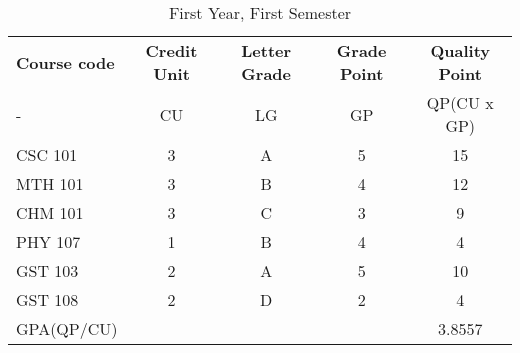 \documentclass{article}
\begin{document}
	\begin{table}
		\caption{First Year, First Semester}
		\label{tab: 1.1 }
		\begin{tabular}{|l| c | c | c |c|}
			\textbf{Course code} & \textbf{Credit Unit} & \textbf{Letter Grade} & 
			\textbf{Grade Point} & \textbf{Quality Point}\\
			-& CU & LG & GP & QP(CU x GP)\\
			\hline
			 CSC 101 & 3 & A & 5 & 15\\
			 MTH 101 & 3 & B & 4 & 12\\
			 CHM 101 & 3 & C & 3 & 9\\
			 PHY 107 & 1 & B & 4 & 4\\
			 GST 103 & 2 & A & 5 & 10\\
			 GST 108 & 2 & D & 2 & 4\\
			GPA(QP/CU) & & & & 3.8557\\
			\hline
			
		\end{tabular}
	\end{table}
	
\end{document}
